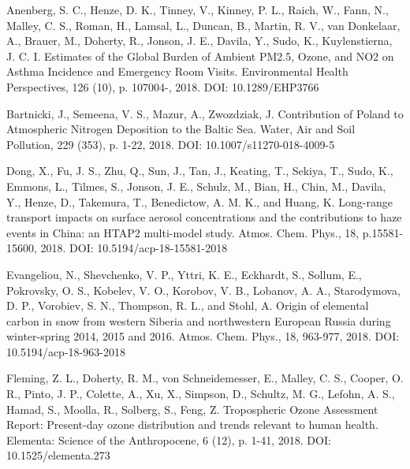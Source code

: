 \enlargethispage{\baselineskip}
\begin{list}{}{\setlength{\leftmargin}{15pt}\setlength{\itemindent}{-\leftmargin}}\small
\item[]
Anenberg, S. C., Henze, D. K., Tinney, V., Kinney, P. L., Raich, W., Fann, N., Malley, C. S., Roman, H., Lamsal, L., Duncan, B., Martin, R. V., van Donkelaar, A., Brauer, M., Doherty, R., Jonson, J. E., Davila, Y., Sudo, K., Kuylenstierna, J. C. I. 
Estimates of the Global Burden of Ambient PM2.5, Ozone, and NO2 on Asthma Incidence and Emergency Room Visits. 
Environmental Health Perspectives, 126 (10), p. 107004-, 2018.
DOI: 10.1289/EHP3766

\item[]
Bartnicki, J., Semeena, V. S., Mazur, A., Zwozdziak, J. 
Contribution of Poland to Atmospheric Nitrogen Deposition to the Baltic Sea. 
Water, Air and Soil Pollution, 229 (353), p. 1-22, 2018.
DOI: 10.1007/s11270-018-4009-5

\item[]
Dong, X., Fu, J. S., Zhu, Q., Sun, J., Tan, J., Keating, T., Sekiya, T., Sudo, K., Emmons, L., Tilmes, S., Jonson, J. E., Schulz, M., Bian, H., Chin, M., Davila, Y., Henze, D., Takemura, T., Benedictow, A. M. K., and Huang, K.
Long-range transport impacts on surface aerosol concentrations and the contributions to haze events in China: an HTAP2 multi-model study.
Atmos. Chem. Phys., 18, p.15581-15600, 2018.
DOI: 10.5194/acp-18-15581-2018

\item[]
Evangeliou, N., Shevchenko, V. P., Yttri, K. E., Eckhardt, S., Sollum, E., Pokrovsky, O. S., Kobelev, V. O., Korobov, V. B., Lobanov, A. A., Starodymova, D. P., Vorobiev, S. N., Thompson, R. L., and Stohl, A.
Origin of elemental carbon in snow from western Siberia and northwestern European Russia during winter-spring 2014, 2015 and 2016. 
Atmos. Chem. Phys., 18, 963-977, 2018.
DOI: 10.5194/acp-18-963-2018

\item[]
Fleming, Z. L., Doherty, R. M., von Schneidemesser, E., Malley, C. S., Cooper, O. R., Pinto, J. P., Colette, A., Xu, X., Simpson, D., Schultz, M. G., Lefohn, A. S., Hamad, S., Moolla, R., Solberg, S., Feng, Z. 
Tropospheric Ozone Assessment Report: Present-day ozone distribution and trends relevant to human health. 
Elementa: Science of the Anthropocene, 6 (12), p. 1-41, 2018.
DOI: 10.1525/elementa.273
  

\end{list}
